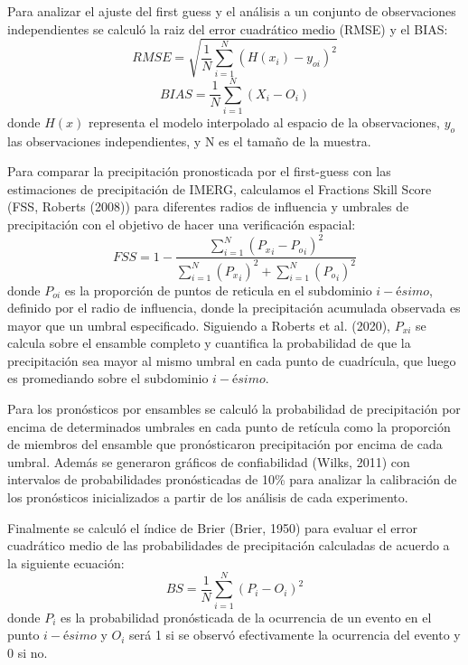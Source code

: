 \documentclass[12pt,oneside,a4paper]{reedthesis}
\begin{document}
Para analizar el ajuste del first guess y el análisis a un conjunto de observaciones independientes se calculó la raiz del error cuadrático medio (RMSE) y el BIAS:
\begin{equation}
\mathit{RMSE} = \sqrt{\frac{1}{N}\sum_{i = 1}^{N} (H(x_i) - y_{oi})^{2}}
\label{eq:eq9}
\end{equation}
\begin{equation}
\mathit{BIAS} = \frac{1}{N}\sum_{i = 1}^{N} (X_i - O_i)
\label{eq:eq10}
\end{equation}
donde \(H(x)\) representa el modelo interpolado al espacio de la observaciones, \(y_{o}\) las observaciones independientes, y N es el tamaño de la muestra.

Para comparar la precipitación pronosticada por el first-guess con las estimaciones de precipitación de IMERG, calculamos el Fractions Skill Score (FSS, Roberts (2008)) para diferentes radios de influencia y umbrales de precipitación con el objetivo de hacer una verificación espacial:
\begin{equation}
\mathit{FSS} = 1-\frac{\sum_{i=1}^{N} ({P_x}_i-{P_o}_i)^{2}}{\sum_{i=1}^{N} ({P_x}_i)^{2}+\sum_{i=1}^{N} ({P_o}_i)^{2}}
\label{eq:eq11}
\end{equation}
donde \(P_{oi}\) es la proporción de puntos de reticula en el subdominio \(i-ésimo\), definido por el radio de influencia, donde la precipitación acumulada observada es mayor que un umbral especificado. Siguiendo a Roberts et al. (2020), \(P_{xi}\) se calcula sobre el ensamble completo y cuantifica la probabilidad de que la precipitación sea mayor al mismo umbral en cada punto de cuadrícula, que luego es promediando sobre el subdominio \(i-ésimo\).

Para los pronósticos por ensambles se calculó la probabilidad de precipitación por encima de determinados umbrales en cada punto de retícula como la proporción de miembros del ensamble que pronósticaron precipitación por encima de cada umbral. Además se generaron gráficos de confiabilidad (Wilks, 2011) con intervalos de probabilidades pronósticadas de 10\% para analizar la calibración de los pronósticos inicializados a partir de los análisis de cada experimento.

Finalmente se calculó el índice de Brier (Brier, 1950) para evaluar el error cuadrático medio de las probabilidades de precipitación calculadas de acuerdo a la siguiente ecuación:
\begin{equation}
\mathit{BS} = \frac{1}{N}\sum_{i=1}^{N} ({P_i}-{O_i})^{2}
\label{eq:eq13}
\end{equation}
donde \(P_i\) es la probabilidad pronósticada de la ocurrencia de un evento en el punto \(i-ésimo\) y \(O_i\) será 1 si se observó efectivamente la ocurrencia del evento y 0 si no.
\end{document}
